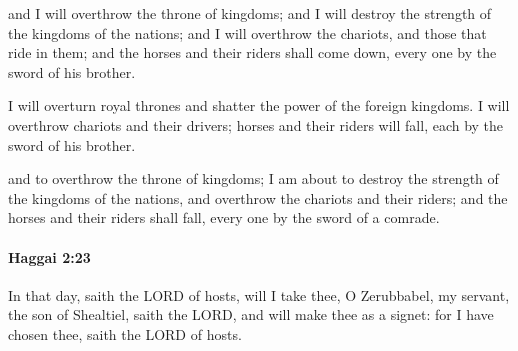 			\begin{versebox}
					\item[BHS] 
					\item[LXX] 
					\item[ASV] and I will overthrow the throne of kingdoms; and I will destroy the strength of the kingdoms of the nations; and I will overthrow the chariots, and those that ride in them; and the horses and their riders shall come down, every one by the sword of his brother.
					\item[NIV] I will overturn royal thrones and shatter the power of the foreign kingdoms. I will overthrow chariots and their drivers; horses and their riders will fall, each by the sword of his brother.
					\item[NRSV] and to overthrow the throne of kingdoms; I am about to destroy the strength of the kingdoms of the nations, and overthrow the chariots and their riders; and the horses and their riders shall fall, every one by the sword of a comrade.
			\end{versebox}

		\paragraph{Haggai 2:23} %
			\label{HAGGAI-2-23}

			In that day, saith the LORD of hosts, will I take thee, O Zerubbabel, my servant, the son of Shealtiel, saith the LORD, and will make thee as a signet: for I have chosen thee, saith the LORD of hosts.

